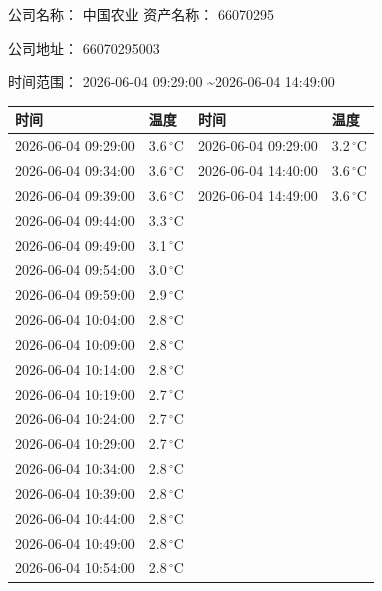 \documentclass[UTF8,10pt,a4paper,fontset=fandol]{ctexart}
\newcommand{\fieldvalue}[1]{#1}
\begin{document}
\newpage

\begin{flushleft}
\scriptsize
公司名称：
\fieldvalue{中国农业}
\hspace{2em}
资产名称：
\fieldvalue{66070295}

公司地址：
\fieldvalue{66070295003}

时间范围：
\fieldvalue{2026-06-04 09:29:00 \textasciitilde 2026-06-04 14:49:00}

\vspace{0.5em}

\begin{tabular}{|p{3.35cm}|p{1.05cm}|p{3.35cm}|p{1.05cm}|}
\hline
时间 & 温度 & 时间 & 温度\\
\hline
2026-06-04 09:29:00 & 3.6\,${}^{\circ}$C & 2026-06-04 09:29:00 & 3.2\,${}^{\circ}$C\\
2026-06-04 09:34:00 & 3.6\,${}^{\circ}$C & 2026-06-04 14:40:00 & 3.6\,${}^{\circ}$C\\
2026-06-04 09:39:00 & 3.6\,${}^{\circ}$C & 2026-06-04 14:49:00 & 3.6\,${}^{\circ}$C\\
2026-06-04 09:44:00 & 3.3\,${}^{\circ}$C & &\\
2026-06-04 09:49:00 & 3.1\,${}^{\circ}$C & &\\
2026-06-04 09:54:00 & 3.0\,${}^{\circ}$C & &\\
2026-06-04 09:59:00 & 2.9\,${}^{\circ}$C & &\\
2026-06-04 10:04:00 & 2.8\,${}^{\circ}$C & &\\
2026-06-04 10:09:00 & 2.8\,${}^{\circ}$C & &\\
2026-06-04 10:14:00 & 2.8\,${}^{\circ}$C & &\\
2026-06-04 10:19:00 & 2.7\,${}^{\circ}$C & &\\
2026-06-04 10:24:00 & 2.7\,${}^{\circ}$C & &\\
2026-06-04 10:29:00 & 2.7\,${}^{\circ}$C & &\\
2026-06-04 10:34:00 & 2.8\,${}^{\circ}$C & &\\
2026-06-04 10:39:00 & 2.8\,${}^{\circ}$C & &\\
2026-06-04 10:44:00 & 2.8\,${}^{\circ}$C & &\\
2026-06-04 10:49:00 & 2.8\,${}^{\circ}$C & &\\
2026-06-04 10:54:00 & 2.8\,${}^{\circ}$C & &\\

\end{tabular}
\end{flushleft}
\end{document}
